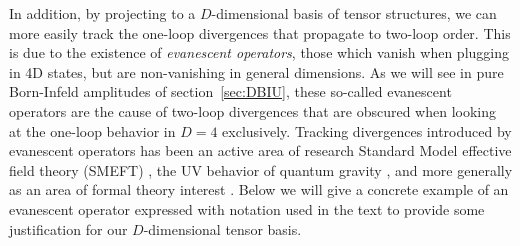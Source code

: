 \documentclass[12pt,letter]{article}
\def\sec#1{section~\ref{#1}}
\begin{document}
In addition, by projecting to a $D$-dimensional basis of tensor structures, we can more easily track the one-loop divergences that propagate to two-loop order. This is due to the existence of \textit{evanescent operators}, those which vanish when plugging in 4D states, but are non-vanishing in general dimensions. As we will see in pure Born-Infeld amplitudes of \sec{sec:DBIU}, these so-called evanescent operators are the cause of two-loop divergences that are obscured when looking at the one-loop behavior in $D=4$ exclusively. Tracking divergences introduced by evanescent operators has been an active area of research Standard Model effective field theory (SMEFT) \cite{Hartmann:2016pil,Chala:2021cgt,Aebischer:2022tvz,Fuentes-Martin:2022vvu,Isidori:2023pyp}, the UV behavior of quantum gravity \cite{Bern:2015xsa,Bern:2017tuc,Bern:2017puu}, and more generally as an area of formal theory interest \cite{Dugan:1990df,Herrlich:1994kh,Bell:2009nk,Becher:2004kk,DiPietro:2017vsp}. Below we will give a concrete example of an evanescent operator expressed with notation used in the text to provide some justification for our $D$-dimensional tensor basis. 
\end{document}
